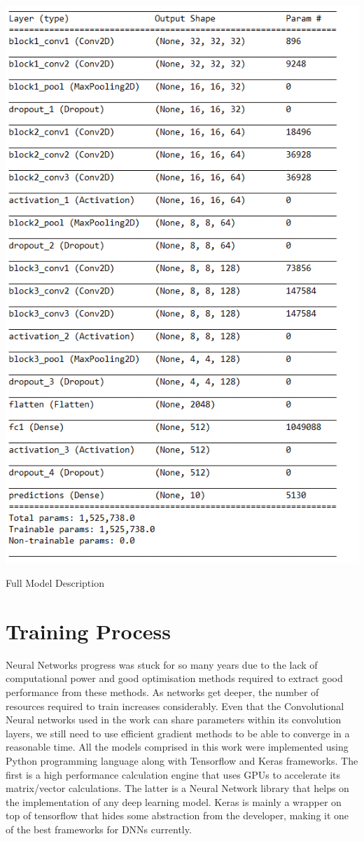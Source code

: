 \begin{table}[!h]
	\centering
	\includegraphics[scale=0.9]{vgg_arch.png}
	\caption{Full Model Description}
	\label{tbl:vgg10}
\end{table}
 
\section{Training Process}

Neural Networks progress was stuck for so many years due to the lack of computational power and good optimisation methods required to extract good performance from these methods. As networks get deeper, the number of resources required to train increases considerably. Even that the Convolutional Neural networks used in the work can share parameters within its convolution layers, we still need to use efficient gradient methods to be able to converge in a reasonable time. All the models comprised in this work were implemented using Python programming language along with Tensorflow and Keras frameworks. The first is a high performance calculation engine that uses GPUs to accelerate its matrix/vector calculations. The latter is a Neural Network library that helps on the implementation of any deep learning model. Keras is mainly a wrapper on top of tensorflow that hides some abstraction from the developer, making it one of the best frameworks for DNNs currently.

